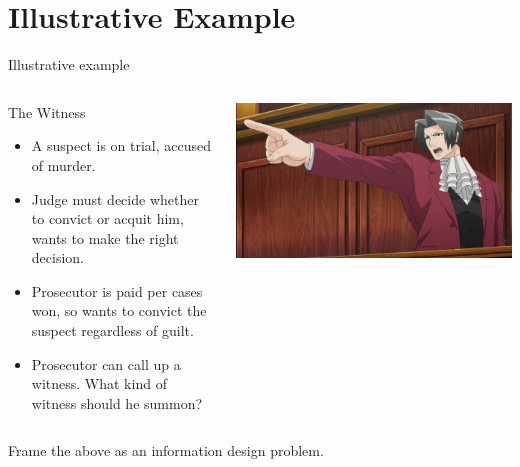 \documentclass[english,10pt
,aspectratio=169
]{beamer}
\begin{document}
\section{Illustrative Example}

\begin{frame}{Illustrative example}
	\begin{columns}
		\begin{column}{0.5\linewidth}
			\begin{exampleblock}{The Witness}
				\begin{itemize}
					\item A suspect is on trial, accused of murder.
					\item Judge must decide whether to convict or acquit him, wants to make the right decision.
					\item Prosecutor is paid per cases won, so wants to convict the suspect regardless of guilt.
					\item Prosecutor can call up a witness. What kind of witness should he summon?
				\end{itemize}
			\end{exampleblock}
		\end{column}
		\begin{column}{0.46\linewidth}
			\includegraphics[scale=0.28]{pics/M7/miles}
		\end{column}
	\end{columns}
	\pause
	\centering
	Frame the above as an information design problem.
\end{frame}
\end{document}

